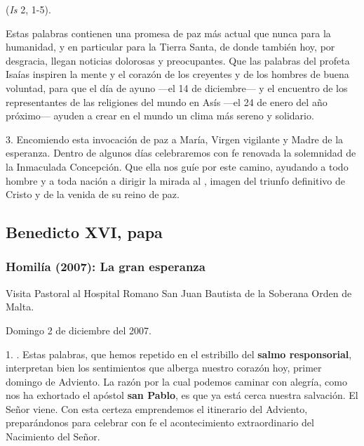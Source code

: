  (\emph{Is} 2, 1-5).

Estas palabras contienen una promesa de paz más actual que nunca para la humanidad, y en particular para la Tierra Santa, de donde también hoy, por desgracia, llegan noticias dolorosas y preocupantes. Que las palabras del profeta Isaías inspiren la mente y el corazón de los creyentes y de los hombres de buena voluntad, para que el día de ayuno ---el 14 de diciembre--- y el encuentro de los representantes de las religiones del mundo en Asís ---el 24 de enero del año próximo--- ayuden a crear en el mundo un clima más sereno y solidario.

3. Encomiendo esta invocación de paz a María, Virgen vigilante y Madre de la esperanza. Dentro de algunos días celebraremos con fe renovada la solemnidad de la Inmaculada Concepción. Que ella nos guíe por este camino, ayudando a todo hombre y a toda nación a dirigir la mirada al , imagen del triunfo definitivo de Cristo y de la venida de su reino de paz.

\subsection{Benedicto XVI, papa}

\subsubsection{Homilía (2007): La gran esperanza}

Visita Pastoral al Hospital Romano San Juan Bautista de la Soberana Orden de Malta.

Domingo 2 de diciembre del 2007.

1. . Estas palabras, que hemos repetido en el estribillo del \textbf{salmo responsorial}, interpretan bien los sentimientos que alberga nuestro corazón hoy, primer domingo de Adviento. La razón por la cual podemos caminar con alegría, como nos ha exhortado el apóstol \textbf{san Pablo}, es que ya está cerca nuestra salvación. El Señor viene. Con esta certeza emprendemos el itinerario del Adviento, preparándonos para celebrar con fe el acontecimiento extraordinario del Nacimiento del Señor.

